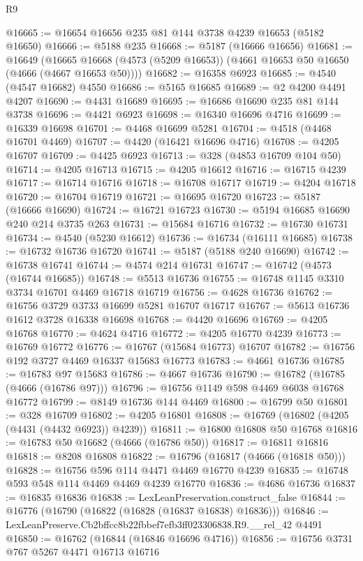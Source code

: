 \begin{lexlean}{R9}
\begin{coremodule}
@16665 := @16654 @16656 @235 @81 @144 @3738 @4239 @16653 (@5182 @16650)
@16666 := @5188 @235
@16668 := @5187 (@16666 @16656)
@16681 := @16649
    (@16665 @16668 (@4573 (@5209 @16653)) (@4661 @16653 @50 @16650 (@4666 (@4667 @16653 @50))))
@16682 := @16358 @6923
@16685 := @4540 (@4547 @16682) @4550
@16686 := @5165 @16685
@16689 := @2 @4200 @4491 @4207
@16690 := @4431 @16689
@16695 := @16686 @16690 @235 @81 @144 @3738
@16696 := @4421 @6923
@16698 := @16340 @16696 @4716
@16699 := @16339 @16698
@16701 := @4468 @16699 @5281
@16704 := @4518 (@4468 @16701 @4469)
@16707 := @4420 (@16421 @16696 @4716)
@16708 := @4205 @16707
@16709 := @4425 @6923
@16713 := @328 (@4853 @16709 @104 @50)
@16714 := @4205 @16713
@16715 := @4205 @16612
@16716 := @16715 @4239
@16717 := @16714 @16716
@16718 := @16708 @16717
@16719 := @4204 @16718
@16720 := @16704 @16719
@16721 := @16695 @16720
@16723 := @5187 (@16666 @16690)
@16724 := @16721 @16723
@16730 := @5194 @16685 @16690 @240 @214 @3735 @263
@16731 := @15684 @16716
@16732 := @16730 @16731
@16734 := @4540 (@5230 @16612)
@16736 := @16734 (@16111 @16685)
@16738 := @16732 @16736 @16720
@16741 := @5187 (@5188 @240 @16690)
@16742 := @16738 @16741
@16744 := @4574 @214 @16731
@16747 := @16742 (@4573 (@16744 @16685))
@16748 := @5513 @16736
@16755 := @16748 @1145 @3310 @3734 @16701 @4469 @16718 @16719
@16756 := @4628 @16736
@16762 := @16756 @3729 @3733 @16699 @5281 @16707 @16717
@16767 := @5613 @16736 @1612 @3728 @16338 @16698
@16768 := @4420 @16696
@16769 := @4205 @16768
@16770 := @4624 @4716
@16772 := @4205 @16770 @4239
@16773 := @16769 @16772
@16776 := @16767 (@15684 @16773) @16707
@16782 := @16756 @192 @3727 @4469 @16337 @15683 @16773
@16783 := @4661 @16736
@16785 := @16783 @97 @15683
@16786 := @4667 @16736
@16790 := @16782 (@16785 (@4666 (@16786 @97)))
@16796 := @16756 @1149 @598 @4469 @6038 @16768 @16772
@16799 := @8149 @16736 @144 @4469
@16800 := @16799 @50
@16801 := @328 @16709
@16802 := @4205 @16801
@16808 := @16769 (@16802 (@4205 (@4431 (@4432 @6923)) @4239))
@16811 := @16800 @16808 @50 @16768
@16816 := @16783 @50 @16682 (@4666 (@16786 @50))
@16817 := @16811 @16816
@16818 := @8208 @16808
@16822 := @16796 (@16817 (@4666 (@16818 @50)))
@16828 := @16756 @596 @114 @4471 @4469 @16770 @4239
@16835 := @16748 @593 @548 @114 @4469 @4469 @4239 @16770
@16836 := @4686 @16736
@16837 := @16835 @16836
@16838 := LexLeanPreservation.construct_false
@16844 := @16776 (@16790 (@16822 (@16828 (@16837 @16838) @16836)))
@16846 := LexLeanPreserve.Cb2bffcc8b22fbbef7efb3ff023306838.R9.__rel_42 @4491
@16850 := @16762 (@16844 (@16846 @16696 @4716))
@16856 := @16756 @3731 @767 @5267 @4471 @16713 @16716

\end{coremodule}
\end{lexlean}
